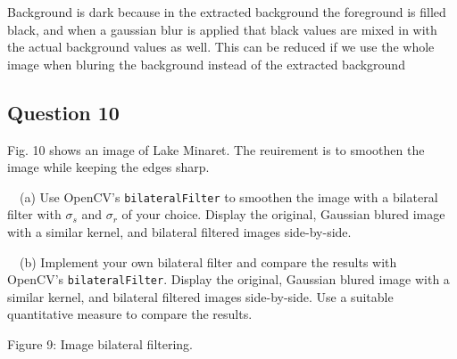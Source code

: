 \documentclass[10pt]{article}
\begin{document}
    \begin{center}
    \end{center}
    
    Background is dark because in the extracted background the foreground is
filled black, and when a gaussian blur is applied that black values are
mixed in with the actual background values as well. This can be reduced
if we use the whole image when bluring the background instead of the
extracted background


\subsection{Question 10}\label{question-10}

Fig. 10 shows an image of Lake Minaret. The reuirement is to smoothen
the image while keeping the edges sharp.

~~(a) Use OpenCV's \texttt{bilateralFilter} to smoothen the image with a
bilateral filter with \(\sigma_s\) and \(\sigma_r\) of your choice.
Display the original, Gaussian blured image with a similar kernel, and
bilateral filtered images side-by-side.

~~(b) Implement your own bilateral filter and compare the results with
OpenCV's \texttt{bilateralFilter}. Display the original, Gaussian blured
image with a similar kernel, and bilateral filtered images side-by-side.
Use a suitable quantitative measure to compare the results.

Figure 9: Image bilateral filtering.
\end{document}
